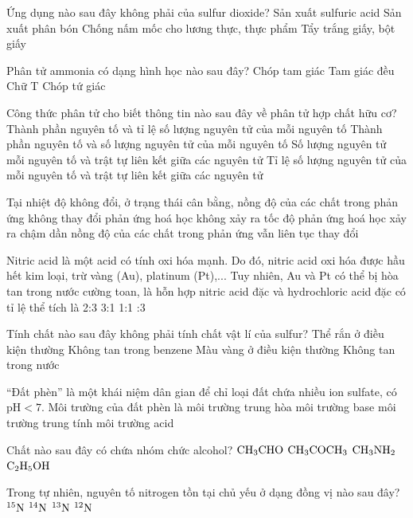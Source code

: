\documentclass[11pt,a4paper]{article}
\begin{document}
\begin{ex}
Ứng dụng nào sau đây không phải của sulfur dioxide?
\choice
{Sản xuất sulfuric acid}
{\True Sản xuất phân bón}
{Chống nấm mốc cho lương thực, thực phẩm}
{Tẩy trắng giấy, bột giấy}
\end{ex}
\begin{ex}
Phân tử ammonia có dạng hình học nào sau đây?
\choice
{\True Chóp tam giác}
{Tam giác đều}
{Chữ T}
{Chóp tứ giác}
\end{ex}
\begin{ex}
Công thức phân tử cho biết thông tin nào sau đây về phân tử hợp chất hữu cơ?
\choice
{Thành phần nguyên tố và tỉ lệ số lượng nguyên tử của mỗi nguyên tố}
{\True Thành phần nguyên tố và số lượng nguyên tử của mỗi nguyên tố}
{Số lượng nguyên tử mỗi nguyên tố và trật tự liên kết giữa các nguyên tử}
{Tỉ lệ số lượng nguyên tử của mỗi nguyên tố và trật tự liên kết giữa các nguyên tử}
\end{ex}
\begin{ex}
Tại nhiệt độ không đổi, ở trạng thái cân bằng,
\choice
{\True nồng độ của các chất trong phản ứng không thay đổi}
{phản ứng hoá học không xảy ra}
{tốc độ phản ứng hoá học xảy ra chậm dần}
{nồng độ của các chất trong phản ứng vẫn liên tục thay đổi}
\end{ex}
\begin{ex}
Nitric acid là một acid có tính oxi hóa mạnh. Do đó, nitric acid oxi hóa được hầu hết kim loại, trừ vàng (Au), platinum (Pt),... Tuy nhiên, Au và Pt có thể bị hòa tan trong nước cường toan, là hỗn hợp nitric acid đặc và hydrochloric acid đặc có tỉ lệ thể tích là
\choice
{2:3}
{3:1}
{1:1}
{:3}
\end{ex}
\begin{ex}
Tính chất nào sau đây không phải tính chất vật lí của sulfur?
\choice
{Thể rắn ở điều kiện thường}
{\True Không tan trong benzene}
{Màu vàng ở điều kiện thường}
{Không tan trong nước}
\end{ex}
\begin{ex}
``Đất phèn'' là một khái niệm dân gian để chỉ loại đất chứa nhiều ion sulfate, có $\text{pH} < 7$. Môi trường của đất phèn là
\choice
{môi trường trung hòa}
{môi trường base}
{môi trường trung tính}
{\True môi trường acid}
\end{ex}
\begin{ex}
Chất nào sau đây có chứa nhóm chức alcohol?
\choice
{$\ce{CH3CHO}$}
{$\ce{CH3COCH3}$}
{$\ce{CH3NH2}$}
{\True $\ce{C2H5OH}$}
\end{ex}
\begin{ex}
Trong tự nhiên, nguyên tố nitrogen tồn tại chủ yếu ở dạng đồng vị nào sau đây?
\choice
{$^{15}\ce{N}$}
{\True $^{14}\ce{N}$}
{$^{13}\ce{N}$}
{$^{12}\ce{N}$}
\end{ex}
\end{document}

